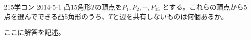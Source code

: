 \begin{prob}{215}{}{学コン 2014-5-1}
 凸15角形$T$の頂点を$P_1, P_2, \cdots, P_{15}$ とする。これらの頂点から5点を選んでできる凸5角形のうち、$T$と辺を共有しないものは何個あるか。
\end{prob}
ここに解答を記述。